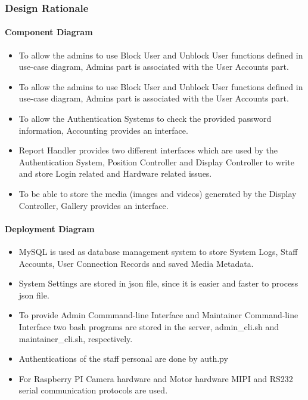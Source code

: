\subsubsection{Design Rationale}
\paragraph{Component Diagram}
\begin{itemize}
	\item To allow the admins to use Block User and Unblock User functions defined in use-case diagram, Admins part is associated with the User Accounts part.
	\item To allow the admins to use Block User and Unblock User functions defined in use-case diagram, Admins part is associated with the User Accounts part.
	\item To allow the Authentication Systems to check the provided password information, Accounting provides an interface.
	\item Report Handler provides two different interfaces which are used by the Authentication System, Position Controller and Display Controller to write and store Login related and Hardware related issues.
	\item To be able to store the media (images and videos) generated by the Display Controller, Gallery provides an interface.
\end{itemize}
\paragraph{Deployment Diagram}
\begin{itemize}
	\item MySQL is used as database management system to store System Logs, Staff Accounts, User Connection Records and saved Media Metadata.
	\item System Settings are stored in json file, since it is easier and faster to process json file.
	\item To provide Admin Commmand-line Interface and Maintainer Command-line Interface two bash programs are stored in the server, admin\_cli.sh and maintainer\_cli.sh, respectively.
	\item Authentications of the staff personal are done by auth.py
	\item For Raspberry PI Camera hardware and Motor hardware MIPI and RS232 serial communication protocols are used.
\end{itemize}